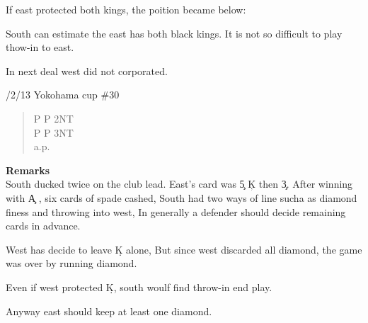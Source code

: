 If east protected both kings, the poition became below:
\begin{quote}
%
  {}%
  {}%
  {}%
  {}%
\end{quote}%

South can estimate the east has both black kings.
It is not so  difficult to play thow-in to east.

In next deal west did not corporated.
\vspace {0.5cm}

/2/13 Yokohama cup \#30
\begin{quote}
%
  {}%
  {}%
  {}%
  {}%
\end{quote}
\begin{quote}
\begin{bidding}
P \s  \> P \> 2NT  \\
P \s \> P \> 3NT \\
a.p.
\end{bidding}
 \end{quote}
{\bf Remarks}\\

South ducked twice on the club lead. East's card was
\c 5 \c K  then \c 3. After winning with \c A , six cards of spade 
cashed, South had two ways of line  sucha as  diamond finess and
throwing into west, In generally a defender should decide 
remaining cards in advance.

West has decide to leave \d K alone, But since west discarded all diamond,
the game was over by running diamond.

Even if west protected \d K, south woulf find throw-in end play.

Anyway east should keep at least one diamond.

